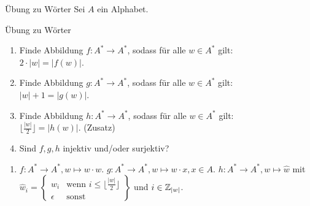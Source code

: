 \begin{frame}{Übung zu Wörter}
	Sei $A$ ein Alphabet.
	
	\begin{taskblock}{Übung zu Wörter}
		\begin{enumerate}
			\item Finde Abbildung $f: A^* \rightarrow A^*$, sodass für alle $w \in A^*$ gilt: \\\quad $2 \cdot |w| = |f(w)|$.
			\item Finde Abbildung $g: A^* \rightarrow A^*$, sodass für alle $w \in A^*$ gilt: \\\quad $|w| + 1 = |g(w)|$.
			\item Finde Abbildung $h: A^* \rightarrow A^*$, sodass für alle $w \in A^*$ gilt: \\\quad $\lfloor \frac{|w|}{2}\rfloor = |h(w)|$. (Zusatz)
			\item Sind $f, g, h$ injektiv und/oder surjektiv?
		\end{enumerate}
	\end{taskblock}

	\pause
	
	\begin{enumerate}
		\item $f: A^* \rightarrow A^*, w \mapsto w \cdot w$.
		\pitem $g: A^* \rightarrow A^*, w \mapsto w \cdot x, x \in A$.
		\pitem $h: A^* \rightarrow A^*, w \mapsto \hat{w}$ mit $ \hat{w}_i = 
			\left\{
			\begin{array}{ll}
			w_i  & \mbox{wenn } i \leq \lfloor\frac{|w|}{2}\rfloor \\
			\epsilon & \mbox{sonst }
			\end{array}
			\right\}
		$ und $i \in \mathbb{Z}_{|w|}$.
	\end{enumerate}
\end{frame}

